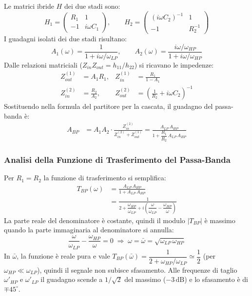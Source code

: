 Le matrici ibride $H$ dei due stadi sono:
\[
    H_1 = \begin{pmatrix} R_1 & 1 \\ -1 & i\omega C_1 \end{pmatrix}, \qquad
    H_2 = \begin{pmatrix} (i\omega C_2)^{-1} & 1 \\ -1 & R_2^{-1} \end{pmatrix}
\]
I guadagni isolati dei due stadi risultano:
\[
    A_1(\omega) = \frac{1}{1 + i\omega/\omega_{LP}}, \qquad
    A_2(\omega) = \frac{i\omega/\omega_{HP}}{1 + i\omega/\omega_{HP}}
\]
Dalle relazioni matriciali ($Z_{in}Z_{out} = h_{11}/h_{22}$) si ricavano le impedenze:
\begin{align}
    Z_{out}^{(1)} &= A_1 R_1, & Z_{in}^{(1)} &= \frac{R_1}{1 - A_1} \\
    Z_{in}^{(2)}  &= \frac{R_2}{A_2}, & Z_{out}^{(2)} &= \left(\frac{1}{R_2} + i\omega C_2\right)^{-1}
\end{align}
Sostituendo nella formula del partitore per la cascata, il guadagno del passa-banda è:
\begin{align}
    A_{BP} &= A_1 A_2 \cdot \frac{Z_{in}^{(2)}}{Z_{in}^{(2)} + Z_{out}^{(1)}}
            = \frac{A_{LP}\,A_{HP}}{1 + \dfrac{R_1}{R_2}\,A_{LP}\,A_{HP}}
\end{align}

\subsubsection{Analisi della Funzione di Trasferimento del Passa-Banda}
Per $R_1 = R_2$ la funzione di trasferimento si semplifica:
\begin{align}
    T_{BP}(\omega)
    &= \frac{A_{LP}\,A_{HP}}{1 + A_{LP}\,A_{HP}} \nonumber\\[4pt]
    &= \frac{1}{2 + \dfrac{\omega_{HP}}{\omega_{LP}}
               + i\!\left(\dfrac{\omega}{\omega_{LP}} - \dfrac{\omega_{HP}}{\omega}\right)}
\end{align}
La parte reale del denominatore è costante, quindi il modulo $|T_{BP}|$ è massimo quando la parte immaginaria al denominatore si annulla:
\[
    \frac{\omega}{\omega_{LP}} - \frac{\omega_{HP}}{\omega} = 0
    \;\Longrightarrow\; \boxed{\omega = \bar{\omega} = \sqrt{\omega_{LP}\,\omega_{HP}}}
\]
In $\bar{\omega}$, la funzione è reale pura e vale $T_{BP}(\bar\omega) = \dfrac{1}{2 + \omega_{HP}/\omega_{LP}} \simeq \dfrac12$ (per $\omega_{HP} \ll \omega_{LP}$), quindi il segnale non subisce sfasamento. Alle frequenze di taglio $\omega'_{HP}$ e $\omega'_{LP}$ il guadagno scende a $1/\sqrt{2}$ del massimo ($-3\,\mathrm{dB}$) e lo sfasamento è di $\mp 45^\circ$.


